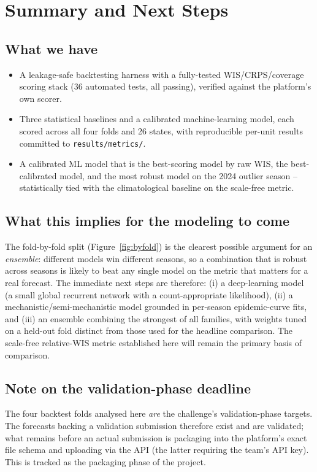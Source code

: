 \documentclass[11pt]{report}
\begin{document}
\chapter{Summary and Next Steps}

\section{What we have}
\begin{itemize}
\item A leakage-safe backtesting harness with a fully-tested WIS/CRPS/coverage scoring stack (36 automated tests, all passing), verified against the platform's own scorer.
\item Three statistical baselines and a calibrated machine-learning model, each scored across all four folds and 26 states, with reproducible per-unit results committed to \texttt{results/metrics/}.
\item A calibrated ML model that is the best-scoring model by raw WIS, the best-calibrated model, and the most robust model on the 2024 outlier season -- statistically tied with the climatological baseline on the scale-free metric.
\end{itemize}

\section{What this implies for the modeling to come}
The fold-by-fold split (Figure~\ref{fig:byfold}) is the clearest possible argument for an \emph{ensemble}: different models win different seasons, so a combination that is robust across seasons is likely to beat any single model on the metric that matters for a real forecast. The immediate next steps are therefore: (i) a deep-learning model (a small global recurrent network with a count-appropriate likelihood), (ii) a mechanistic/semi-mechanistic model grounded in per-season epidemic-curve fits, and (iii) an ensemble combining the strongest of all families, with weights tuned on a held-out fold distinct from those used for the headline comparison. The scale-free relative-WIS metric established here will remain the primary basis of comparison.

\section{Note on the validation-phase deadline}
The four backtest folds analysed here \emph{are} the challenge's validation-phase targets. The forecasts backing a validation submission therefore exist and are validated; what remains before an actual submission is packaging into the platform's exact file schema and uploading via the API (the latter requiring the team's API key). This is tracked as the packaging phase of the project.
\end{document}
